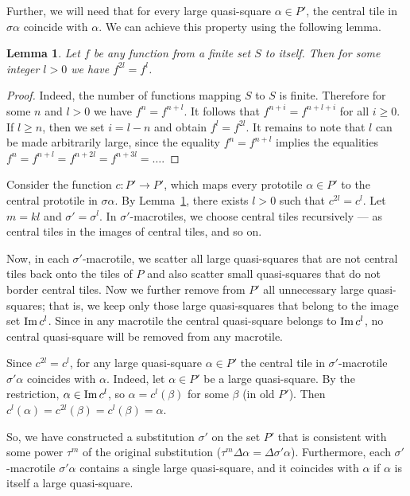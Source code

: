 \documentclass[12pt]{article}
\newtheorem{lemma}{Lemma}
\theoremstyle{remark}
\newcommand{\im}{\text{Im\,}}
\newcommand{\cen}{c}
\begin{document}
Further, we will need  that for every large quasi-square
$\alpha\in P'$, the central tile in $\sigma\alpha$ coincide with $\alpha$.
We can achieve this property using the following lemma.

\begin{lemma}\label{l23}
Let $f$ be any function from a finite set $S$ to itself.
Then for some integer $l>0$ we have $f^{2l}=f^l$.
\end{lemma}
\begin{proof}
Indeed, the number of functions mapping $S$ to $S$ is finite. Therefore 
for some $n$ and $l>0$ we have $f^n=f^{n+l}$.
It follows that $f^{n+i}=f^{n+l+i}$ for all $i\ge 0$.
If $l\ge n$, then we set $i=l-n$ and obtain $f^{l}=f^{2l}$.
It remains to note that $l$ can be made arbitrarily large,
since the equality $f^n=f^{n+l}$ implies the equalities $f^n=f^{n+l}=f^{n+2l}=f^{n+3l}=\dots$.
\end{proof}






Consider the function $\cen:P'\to P'$, \label{centr} which maps every prototile $\alpha\in P'$ to the central prototile in
$\sigma\alpha$. By Lemma~\ref{l23},
there exists $l>0$ such that $\cen^{2l}=\cen^{l}$. Let $m=kl$ and $\sigma'=\sigma^l$.
In $\sigma'$-macrotiles, we choose central
tiles recursively --- as central tiles in the images of central tiles, and so on. 



Now, in each $\sigma'$-macrotile, we scatter all large quasi-squares that are not central tiles back onto the tiles of $P$
and also scatter small quasi-squares that do not border central tiles.
Now we further remove from $P'$ all unnecessary large quasi-squares; that is, we keep only those large quasi-squares that belong to the image set $\im\cen^l$.
Since in any macrotile the central quasi-square belongs to $\im\cen^l$, no central quasi-square will be removed from any macrotile.

Since
$\cen^{2l}=\cen^{l}$, for any large quasi-square $\alpha\in P'$
the central tile in $\sigma'$-macrotile $\sigma'\alpha$ coincides with $\alpha$.
Indeed, let  $\alpha\in P'$ be a large quasi-square. By the restriction, $\alpha\in \im \cen^l$,
so $\alpha=\cen^l(\beta)$ for some $\beta$ (in old $P'$). Then 
$\cen^l(\alpha)=\cen^{2l}(\beta)=\cen^{l}(\beta)=\alpha$.


So, we have constructed a substitution $\sigma'$ on the set $P'$ that is consistent with some power $\tau^m$
of the original substitution ($\tau^m\Delta\alpha=\Delta\sigma'\alpha$). Furthermore,
each $\sigma'$-macrotile $\sigma'\alpha$ contains a single large quasi-square,
and it coincides with $\alpha$ if $\alpha$ is itself a large quasi-square. 
\end{document}

